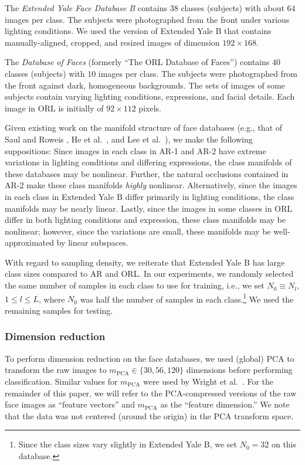 \documentclass[review]{elsarticle}
\begin{document}
The \emph{Extended Yale Face Database B} \cite{geo:illum} contains $38$ classes (subjects) with about $64$ images per class. The subjects were photographed from the front under various lighting conditions. We used the version of Extended Yale B that contains manually-aligned, cropped, and resized images of dimension $192 \times 168$. 


The \emph{Database of Faces} (formerly ``The ORL Database of Faces'') \cite{att:orl} contains $40$ classes (subjects) with $10$ images per class. The subjects were photographed from the front against dark, homogeneous backgrounds. The sets of images of some subjects contain varying lighting conditions, expressions, and facial details. Each image in ORL is initially of $92 \times 112$ pixels. 


Given existing work on the manifold structure of face databases (e.g., that of Saul and Roweis \cite{row:lle}, He et al.\ \cite{he:lapface}, and Lee et al.\ \cite{lee:linss}), we make the following suppositions: Since images in each class in AR-1 and AR-2 have extreme variations in lighting conditions and differing expressions, the class manifolds of these databases may be nonlinear. Further, the natural occlusions contained in AR-2 make these class manifolds \emph{highly} nonlinear. Alternatively, since the images in each class in Extended Yale B differ primarily in lighting conditions, the class manifolds may be nearly linear. Lastly, since the images in some classes in ORL differ in both lighting conditions and expression, these class manifolds may be nonlinear; however, since the variations are small, these manifolds may be well-approximated by linear subspaces.

With regard to sampling density, we reiterate that Extended Yale B has large class sizes compared to AR and ORL. In our experiments, we randomly selected the same number of samples in each class to use for training, i.e., we set $N_0 \equiv N_l$, $1\leq l \leq L$, where $N_0$ was half the number of samples in each class.\footnote{Since the class sizes vary slightly in Extended Yale B, we set $N_0 = 32$ on this database.} We used the remaining samples for testing.


\subsubsection{Dimension reduction} \label{sec:dr}
 
To perform dimension reduction on the face databases, we used (global) PCA to transform the raw images to $m_{\mathrm{PCA}} \in \{30, 56,120\}$ dimensions before performing classification. Similar values for $m_{\mathrm{PCA}}$ were used by Wright et al.\ \cite{wri:src}. For the remainder of this paper, we will refer to the PCA-compressed versions of the raw face images as ``feature vectors'' and $m_\mathrm{PCA}$ as the ``feature dimension.'' We note that the data was not centered (around the origin) in the PCA transform space.
\end{document}
